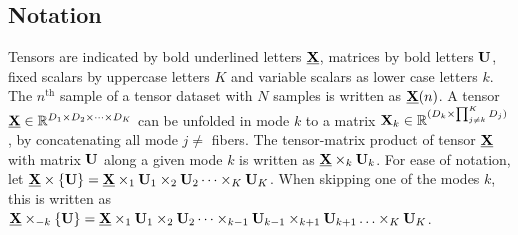 \subsection{Notation}
Tensors are indicated by bold underlined letters $\ten{X}$, matrices by bold
letters $\mat{U}$, fixed scalars by uppercase letters $K$ and variable
scalars as lower case letters $k$.
The $n^\text{th}$ sample of a tensor dataset with $N$ samples is written as
$\ten{X}(n)$.
A tensor $\ten{X}\in \mathbb{R}^{D_1\times D_2 \times \cdots \times D_K}$ can be
unfolded in mode $k$ to a matrix
$\mat{X}_k\in\mathbb{R}^{(D_k\times\prod_{j\neq k}^K D_j)}$, by concatenating
all mode $j\neq$ fibers.
The tensor-matrix product of tensor $\ten{X}$ with matrix $\mat{U}$ along a
given mode $k$ is written as $\ten{X}\mpr{\mat{U}}{k}$. For ease of notation, let
$\ten{X}\mmpr{\mat{U}} =
	\ten{X}\mpr{\mat{U}}{1}\mpr{\mat{U}}{2}\cdots\mpr{\mat{U}}{K}$.
When skipping one of the modes $k$, this is
written as $\ten{X}\mmprs{\mat{U}}{k} =
	\ten{X}\mpr{\mat{U}}{1}\mpr{\mat{U}}{2}\cdots\mpr{\mat{U}}{k-1}\mpr{\mat{U}}{k+1}\ldots\mpr{\mat{U}}{K}$.


